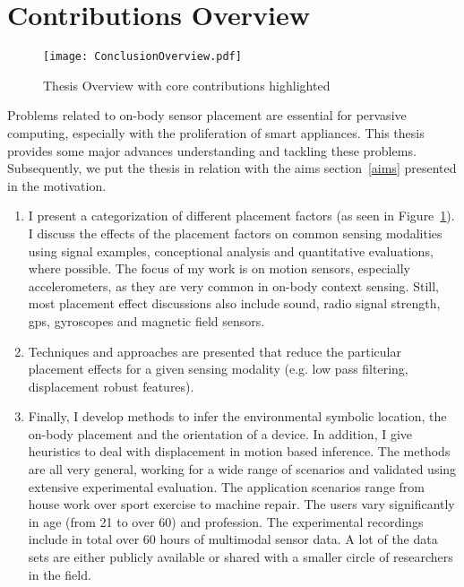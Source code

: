 \section{Contributions Overview}

\begin{figure}[t]
  \begin{center}
  \texttt{[image: ConclusionOverview.pdf]}
	\end{center}
  \caption[Thesis contributions]{Thesis Overview with core contributions highlighted}
\label{fig:ConclusionGraph}
\end{figure} 
Problems related to on-body sensor placement are essential for pervasive computing, especially with the proliferation of smart appliances. This thesis provides some major advances understanding and tackling these problems. Subsequently, we put the thesis in relation with the aims section~\ref{aims} presented in the motivation. 
\begin{enumerate}
\item I present a categorization of different placement factors (as seen in Figure~\ref{fig:ConclusionGraph}). I discuss the effects of the placement factors on common sensing modalities using signal examples, conceptional analysis and quantitative evaluations, where possible. The focus of my work is on motion sensors, especially accelerometers, as they are very common in on-body context sensing. Still, most placement effect discussions also include sound, radio signal strength, gps, gyroscopes and magnetic field sensors.
\item Techniques and approaches are presented that reduce the particular placement effects for a given sensing modality (e.g. low pass filtering, displacement robust features).
\item Finally, I develop methods to infer the environmental symbolic location, the on-body placement and the orientation of a device. In addition, I give heuristics to deal with displacement in motion based inference. The methods are all very general, working for a wide range of scenarios and validated using extensive experimental evaluation. The application scenarios range from house work over sport exercise to machine repair. The users vary significantly in age (from 21 to over 60) and profession. The experimental recordings include in total over 60 hours of multimodal sensor data. A lot of the data sets are either publicly available or shared with a smaller circle of researchers in the field.
\end{enumerate}

